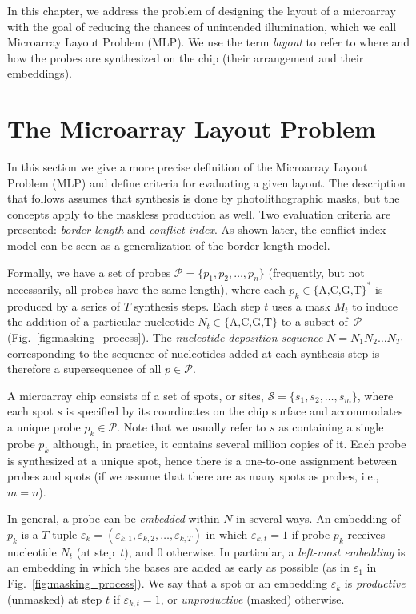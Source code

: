 \documentclass{w-edbk}
\newcommand{\eps}{\varepsilon}
\begin{document}
In this chapter, we address the problem of designing the layout of a
microarray with the goal of reducing the chances of unintended illumination,
which we call Microarray Layout Problem (MLP). We use the term \emph{layout}
to refer to where and how the probes are synthesized on the chip (their
arrangement and their embeddings).


\section{The Microarray Layout Problem}
\label{sec:eval}

In this section we give a more precise definition of the Microarray Layout
Problem (MLP) and define criteria for evaluating a given layout. The description
that follows assumes that synthesis is done by photolithographic masks, but the
concepts apply to the maskless production as well. Two evaluation criteria are
presented: \emph{border length} and \emph{conflict index}. As shown
later, the conflict index model can be seen as a generalization of the border
length model.

Formally, we have a set of probes $\mathcal{P} = \{p_{1}, p_{2},
\dots, p_{n}\}$ (frequently, but not necessarily, all probes have the
same length), where each $p_k \in \{\text{A,C,G,T}\}^\ast$ is
produced by a series of $T$ synthesis steps. Each step $t$ uses a mask
$M_t$ to induce the addition of a particular nucleotide $N_t \in
\{\text{A,C,G,T}\}$ to a subset of~$\mathcal{P}$
(Fig.~\ref{fig:masking_process}).  The \emph{nucleotide deposition
  sequence} $N = N_{1} N_{2} \ldots N_{T}$ corresponding to the
sequence of nucleotides added at each synthesis step is therefore a
supersequence of all $p \in \mathcal{P}$.

A microarray chip consists of a set of spots, or sites, $\mathcal{S} =
\{s_{1}, s_{2}, \dots, s_{m}\}$, where each spot $s$ is specified by its
coordinates on the chip surface and accommodates a unique probe
$p_k \in \mathcal{P}$. Note that we usually refer to $s$ as
containing a single probe $p_k$ although, in practice, it
contains several million copies of it. Each probe is synthesized at a
unique spot, hence there is a one-to-one assignment between probes and
spots (if we assume that there are as many spots as probes, i.e.,
$m=n$).

In general, a probe can be \emph{embedded} within $N$ in several ways.
An embedding of $p_{k}$ is a $T$-tuple $\eps_{k} = (\eps_{k,1},
\eps_{k,2}, \dots, \eps_{k,T})$ in which $\eps_{k,t} = 1$ if probe
$p_{k}$ receives nucleotide $N_{t}$ (at step~$t$), and 0 otherwise.  In
particular, a \emph{left-most embedding} is an embedding in which the
bases are added as early as possible (as in $\eps_1$ in
Fig.~\ref{fig:masking_process}).  We say that a spot or an embedding
$\eps_k$ is \emph{productive} (unmasked) at step $t$ if $\eps_{k,t} =
1$, or \emph{unproductive} (masked) otherwise.
\end{document}
